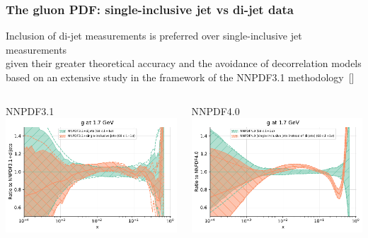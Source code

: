 \documentclass{beamer}
\begin{document}
\begin{frame}
 \frametitle{The gluon PDF: single-inclusive jet vs di-jet data}
 \footnotesize
 \centering
 Inclusion of di-jet measurements is preferred over single-inclusive jet measurements\\
 given their greater theoretical accuracy and the avoidance of decorrelation models\\
 {\scriptsize based on an extensive study in the framework of the NNPDF3.1 methodology~{\tiny{[{\color{salmon}{EPJ\,C80\,(2020)\,8}}]}}}\\
 \vspace{0.2cm}
 \begin{columns}[c]
  \begin{column}{0.5\textwidth}
   \centering
   NNPDF3.1\\
   \includegraphics[width=\columnwidth]{plots/gluon_3}\\
  \end{column}
  \begin{column}{0.5\textwidth}
   \centering
   NNPDF4.0\\
   \includegraphics[width=\columnwidth]{plots/gluon_4}\\ 

\end{column}
\end{columns}
\end{frame}
\end{document}
